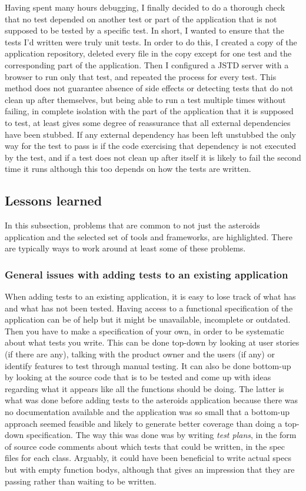 \documentclass[11pt]{article}
\begin{document}
Having spent many hours debugging, I finally decided to do a thorough check that no test depended on another test or part of the application that is not supposed to be tested by a specific test. In short, I wanted to ensure that the tests I'd written were truly unit tests. In order to do this, I created a copy of the application repository, deleted every file in the copy except for one test and the corresponding part of the application. Then I configured a JSTD server with a browser to run only that test, and repeated the process for every test. This method does not guarantee absence of side effects or detecting tests that do not clean up after themselves, but being able to run a test multiple times without failing, in complete isolation with the part of the application that it is supposed to test, at least gives some degree of reassurance that all external dependencies have been stubbed. If any external dependency has been left unstubbed the only way for the test to pass is if the code exercising that dependency is not executed by the test, and if a test does not clean up after itself it is likely to fail the second time it runs although this too depends on how the tests are written.

\subsection{Lessons learned}

In this subsection, problems that are common to not just the asteroids application and the selected set of tools and frameworks, are highlighted. There are typically ways to work around at least some of these problems.

\subsubsection{General issues with adding tests to an existing application}

When adding tests to an existing application, it is easy to lose track of what has and what has not been tested. Having access to a functional specification of the application can be of help but it might be unavailable, incomplete or outdated. Then you have to make a specification of your own, in order to be systematic about what tests you write. This can be done top-down by looking at user stories (if there are any), talking with the product owner and the users (if any) or identify features to test through manual testing. It can also be done bottom-up by looking at the source code that is to be tested and come up with ideas regarding what it appears like all the functions should be doing. The latter is what was done before adding tests to the asteroids application because there was no documentation available and the application was so small that a bottom-up approach seemed feasible and likely to generate better coverage than doing a top-down specification. The way this was done was by writing \emph{test plans}, in the form of source code comments about which tests that could be written, in the \gls{spec} files for each class. Arguably, it could have been beneficial to write actual \glspl{spec} but with empty function bodys, although that gives an impression that they are passing rather than waiting to be written.
\end{document}
